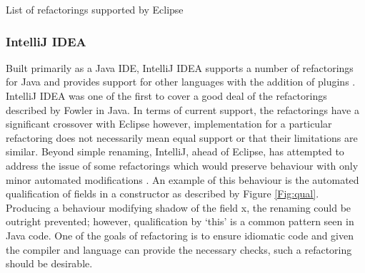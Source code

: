 
\begin{center}
\begin{fig}
\caption{List of refactorings supported by Eclipse}
\label{Fig:eclipse}
\end{fig}
\end{center}

\subsubsection{IntelliJ IDEA}
Built primarily as a Java IDE, IntelliJ IDEA supports a number of refactorings for Java and provides support for other languages with the addition of plugins \cite{jetbrains15}. IntelliJ IDEA was one of the first to cover a good deal of the refactorings described by Fowler in Java. In terms of current support, the refactorings have a significant crossover with Eclipse however, implementation for a particular refactoring does not necessarily mean equal support or that their limitations are similar. Beyond simple renaming, IntelliJ, ahead of Eclipse, has attempted to address the issue of some refactorings which would preserve behaviour with only minor automated modifications \cite{schafer2010specification}. An example of this behaviour is the automated qualification of fields in a constructor as described by Figure \ref{Fig:qual}. Producing a behaviour modifying shadow of the field x, the renaming could be outright prevented; however, qualification by `this' is a common pattern seen in Java code. One of the goals of refactoring is to ensure idiomatic code and given the compiler and language can provide the necessary checks, such a refactoring should be desirable.

